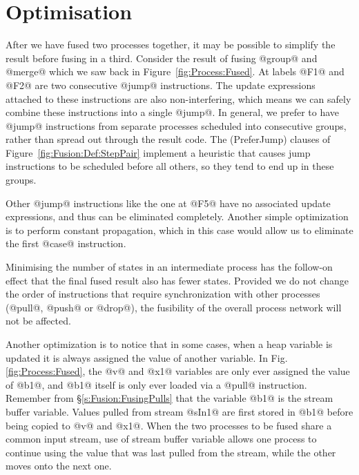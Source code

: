 \section{Optimisation}
\label{s:Optimisation}
After we have fused two processes together, it may be possible to simplify the result before fusing in a third. Consider the result of fusing @group@ and @merge@ which we saw back in Figure~\ref{fig:Process:Fused}. At labels @F1@ and @F2@ are two consecutive @jump@ instructions.
The update expressions attached to these instructions are also non-interfering, which means we can safely combine these instructions into a single @jump@.
In general, we prefer to have @jump@ instructions from separate processes scheduled into consecutive groups, rather than spread out through the result code.
The (PreferJump) clauses of Figure~\ref{fig:Fusion:Def:StepPair} implement a heuristic that causes jump instructions to be scheduled before all others, so they tend to end up in these groups.

Other @jump@ instructions like the one at @F5@ have no associated update expressions, and thus can be eliminated completely. Another simple optimization is to perform constant propagation, which in this case would allow us to eliminate the first @case@ instruction. 

Minimising the number of states in an intermediate process has the follow-on effect that the final fused result also has fewer states. Provided we do not change the order of instructions that require synchronization with other processes (@pull@, @push@ or @drop@), the fusibility of the overall process network will not be affected.

Another optimization is to notice that in some cases, when a heap variable is updated it is always assigned the value of another variable. In Fig.\ref{fig:Process:Fused}, the @v@ and @x1@ variables are only ever assigned the value of @b1@, and @b1@ itself is only ever loaded via a @pull@ instruction. Remember from \S\ref{s:Fusion:FusingPulls} that the variable @b1@ is the stream buffer variable. Values pulled from stream @sIn1@ are first stored in @b1@ before being copied to @v@ and @x1@. When the two processes to be fused share a common input stream, use of stream buffer variable allows one process to continue using the value that was last pulled from the stream, while the other moves onto the next one. 


